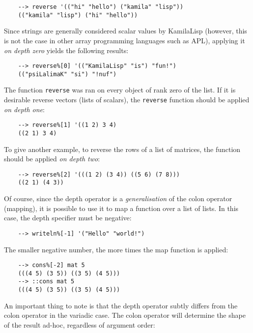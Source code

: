 \begin{Verbatim}
    --> reverse '(("hi" "hello") ("kamila" "lisp"))
    (("kamila" "lisp") ("hi" "hello"))
\end{Verbatim}

Since strings are generally considered scalar values by KamilaLisp (however, this is not the case in other array programming languages such as APL), applying it \textit{on depth zero} yields the following results:

\begin{Verbatim}
    --> reverse%[0] '(("KamilaLisp" "is") "fun!")
    (("psiLalimaK" "si") "!nuf")
\end{Verbatim}

The function \verb|reverse| was ran on every object of rank zero of the list. If it is desirable reverse vectors (lists of scalars), the \verb|reverse| function should be applied \textit{on depth one}:

\begin{Verbatim}
    --> reverse%[1] '((1 2) 3 4)
    ((2 1) 3 4)
\end{Verbatim}

To give another example, to reverse the rows of a list of matrices, the function should be applied \textit{on depth two}:

\begin{Verbatim}
    --> reverse%[2] '(((1 2) (3 4)) ((5 6) (7 8)))
    ((2 1) (4 3))
\end{Verbatim}

Of course, since the depth operator is a \textit{generalisation} of the colon operator (mapping), it is possible to use it to map a function over a list of lists. In this case, the depth specifier must be negative:

\begin{Verbatim}
    --> writeln%[-1] '("Hello" "world!")
\end{Verbatim}

The smaller negative number, the more times the map function is applied:

\begin{Verbatim}
    --> cons%[-2] mat 5
    (((4 5) (3 5)) ((3 5) (4 5)))
    --> ::cons mat 5
    (((4 5) (3 5)) ((3 5) (4 5)))
\end{Verbatim}

An important thing to note is that the depth operator subtly differs from the colon operator in the variadic case. The colon operator will determine the shape of the result ad-hoc, regardless of argument order:

